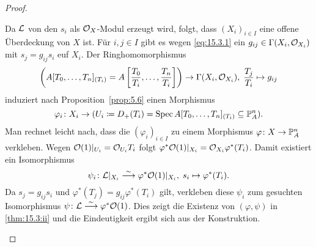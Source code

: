 \begin{thm}
\begin{proof}
\begin{enumerate}[i)]
			Da $\mcl$ von den $s_i$ als $\mco_X$-Modul erzeugt wird, folgt, dass $(X_i)_{i\in I}$ eine offene Überdeckung von $X$ ist. Für $i,j \in I$ gibt es wegen \eqref{eq:15.3.1} ein $g_{ij} \in \Gamma(X_i,\mco_{X_i})$ mit $s_j = g_{ij} s_i$ euf $X_i$. Der Ringhomomorphismus
			\[
				\left(A[T_0,\ldots,T_n]_{(T_i)} = A\left[\frac{T_0}{T_i},\ldots,\frac{T_n}{T_i}\right] \right)\to \Gamma(X_i,\mco_{X_i}),\; \frac{T_j}{T_i} \mapsto g_{ij}
			\]
			induziert nach Proposition~\ref{prop:5.6} einen Morphismus
			\[
				\varphi_i\colon X_i \to (U_i\coloneqq D_+(T_i) = \Spec A[T_0,\ldots,T_n]_{(T_i)} \subseteq \P^n_A).
			\]
			Man rechnet leicht nach, dass die $(\varphi_i)_{i\in I}$ zu einem Morphismus $\varphi \colon X \to \P^n_A$ verkleben. Wegen $\mco(1)\vert_{U_i} = \mco_{U_i}T_i$ folgt $\varphi^*\mco(1)\vert_{X_i} = \mco_{X_i} \varphi^*(T_i)$. Damit existiert ein Isomorphismus
			\[
				\psi_i\colon \mcl\vert_{X_i} \simto \varphi^*\mco(1)\vert_{X_i}, \; s_i \mapsto \varphi^*(T_i).
			\]
			Da $s_j = g_{ij}s_i$ und $\varphi^*(T_j)=g_{ij}\varphi^*(T_i)$ gilt, verkleben diese $\psi_i$ zum gesuchten Isomorphismus $\psi\colon \mcl \simto \varphi^*\mco(1)$. Dies zeigt die Existenz von $(\varphi,\psi)$ in \ref{thm:15.3:ii} und die Eindeutigkeit ergibt sich aus der Konstruktion.
		\end{enumerate}
	\end{proof}
\end{thm}

